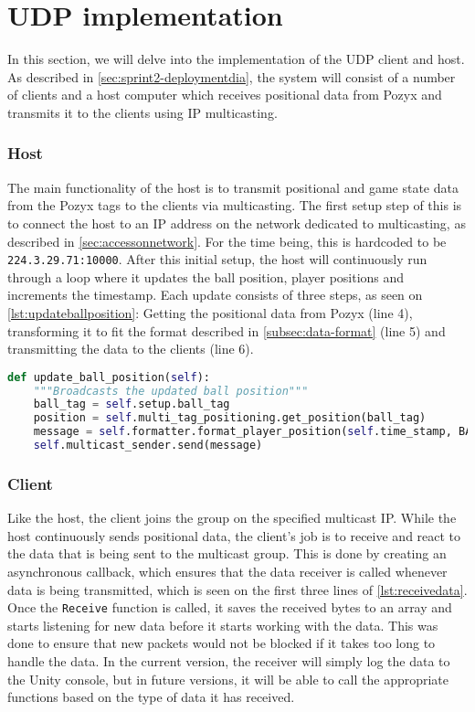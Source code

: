 \section{UDP implementation}
In this section, we will delve into the implementation of the UDP client and host.
As described in \autoref{sec:sprint2-deploymentdia}, the system will consist of a number of clients and a host computer which receives positional data from Pozyx and transmits it to the clients using IP multicasting.

\subsubsection{Host}
The main functionality of the host is to transmit positional and game state data from the Pozyx tags to the clients via multicasting.
The first setup step of this is to connect the host to an IP address on the network dedicated to multicasting, as described in \autoref{sec:accessonnetwork}.
For the time being, this is hardcoded to be \texttt{224.3.29.71:10000}.
After this initial setup, the host will continuously run through a loop where it updates the ball position, player positions and increments the timestamp.
Each update consists of three steps, as seen on \autoref{lst:updateballposition}: Getting the positional data from Pozyx (line 4), transforming it to fit the format described in \autoref{subsec:data-format} (line 5) and transmitting the data to the clients (line 6).

\begin{lstlisting}[caption={Updating ball position}, captionpos=b,language=Python,label={lst:updateballposition}]
def update_ball_position(self):
    """Broadcasts the updated ball position"""
    ball_tag = self.setup.ball_tag
    position = self.multi_tag_positioning.get_position(ball_tag)
    message = self.formatter.format_player_position(self.time_stamp, BALL_ID, position.x, position.y)
    self.multicast_sender.send(message)
\end{lstlisting}

\subsubsection{Client}
Like the host, the client joins the group on the specified multicast IP.
While the host continuously sends positional data, the client's job is to receive and react to the data that is being sent to the multicast group.
This is done by creating an asynchronous callback, which ensures that the data receiver is called whenever data is being transmitted, which is seen on the first three lines of \autoref{lst:receivedata}.
Once the \texttt{Receive} function is called, it saves the received bytes to an array and starts listening for new data before it starts working with the data.
This was done to ensure that new packets would not be blocked if it takes too long to handle the data.
In the current version, the receiver will simply log the data to the Unity console, but in future versions, it will be able to call the appropriate functions based on the type of data it has received.

